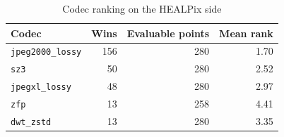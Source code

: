 \begin{table}[t]
\centering
\caption{Codec ranking on the HEALPix side}
\label{tab:codec_ranking}
\footnotesize
\setlength{\tabcolsep}{3pt}
\begin{tabular}{lrrr}
\toprule
Codec & Wins & Evaluable points & Mean rank \\
\midrule
\texttt{jpeg2000\_lossy} & 156 & 280 & 1.70 \\
\texttt{sz3} & 50 & 280 & 2.52 \\
\texttt{jpegxl\_lossy} & 48 & 280 & 2.97 \\
\texttt{zfp} & 13 & 258 & 4.41 \\
\texttt{dwt\_zstd} & 13 & 280 & 3.35 \\
\bottomrule
\end{tabular}
\end{table}
